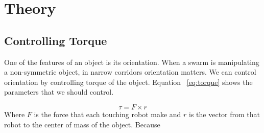 \section{Theory}
\label{sec:theory}
\subsection{Controlling Torque}

One of the features of an object is its orientation. When a swarm is manipulating a non-symmetric object, in narrow corridors orientation matters. We can control orientation by controlling torque of the object. Equation ~\ref{eq:torque} shows the parameters that we should control.

\begin{equation}
\tau = F \times r\label{eq:torque}
\end{equation}
Where $F$ is the force that each touching robot make and $r$ is the vector from that robot to the center of mass of the object. Because 





